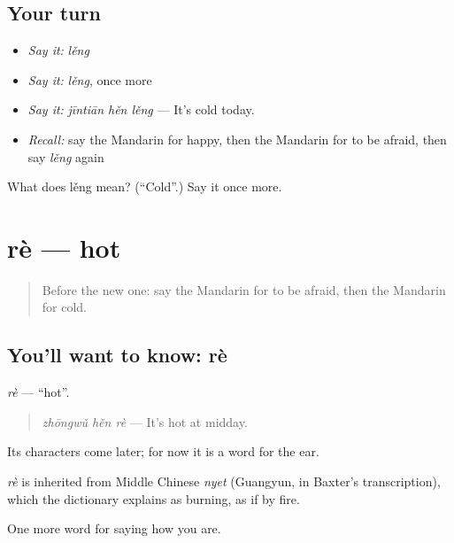 \subsection*{Your turn}
\begin{itemize}
\raggedright
  \item \emph{Say it:} \emph{lěng}
  \item \emph{Say it:} \emph{lěng}, once more
  \item \emph{Say it:} \emph{jīntiān hěn lěng} — It's cold today.
  \item \emph{Recall:} say the Mandarin for happy, then the Mandarin for to be afraid, then say \emph{lěng} again
\end{itemize}

\begin{tcolorbox}[breakable,colback=teal!4,colframe=teal!35!black,title={Before you move on}]
What does lěng mean? (\textquotedblleft{}Cold\textquotedblright{}.) Say it once more.
\end{tcolorbox}
\section[rè]{rè — hot}

\label{lesson:ZH-C51-re}



\begin{quote}
Before the new one: say the Mandarin for to be afraid, then the Mandarin for cold.
\end{quote}

\subsection*{You'll want to know: rè}
\emph{rè} — \textquotedblleft{}hot\textquotedblright{}.

\begin{quote}
\emph{zhōngwǔ hěn rè} — It's hot at midday.
\end{quote}

Its characters come later; for now it is a word for the ear.

\begin{cousinweb}
\emph{rè} is inherited from Middle Chinese \emph{nyet} (Guangyun, in Baxter's transcription), which the dictionary explains as burning, as if by fire.
\end{cousinweb}

\begin{grammarlens}[title={What you've built}]
One more word for saying how you are.
\end{grammarlens}

